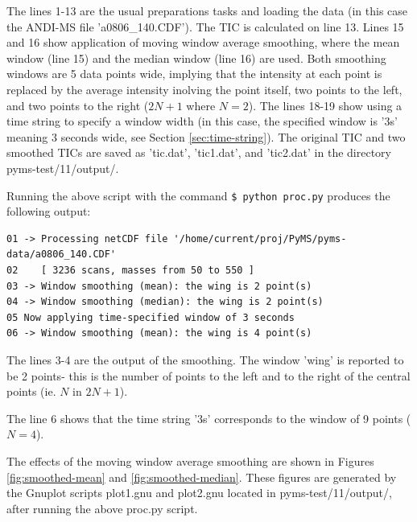 \noindent
The lines 1-13 are the usual preparations tasks and loading the data (in this
case the ANDI-MS file 'a0806\_140.CDF'). The TIC is calculated on line 13.
Lines 15 and 16 show application of moving window average smoothing, where
the mean window (line 15) and the median window (line 16) are used. Both
smoothing windows are 5 data points wide, implying that the intensity at
each point is replaced by the average intensity inolving the point itself,
two points to the left, and two points to the right ($2N+1$ where $N=2$).
The lines 18-19 show using a time string to specify a window width (in
this case, the specified window is '3s' meaning 3 seconds wide, see
Section \ref{sec:time-string}).  The original TIC and two smoothed TICs are
saved as 'tic.dat', 'tic1.dat', and 'tic2.dat' in the directory
pyms-test/11/output/.

Running the above script with the command {\tt \$ python proc.py} produces
the following output:

\begin{verbatim}
01 -> Processing netCDF file '/home/current/proj/PyMS/pyms-data/a0806_140.CDF'
02    [ 3236 scans, masses from 50 to 550 ]
03 -> Window smoothing (mean): the wing is 2 point(s)
04 -> Window smoothing (median): the wing is 2 point(s)
05 Now applying time-specified window of 3 seconds
06 -> Window smoothing (mean): the wing is 4 point(s)
\end{verbatim}

\noindent
The lines 3-4 are the output of the smoothing.  The window 'wing' is reported
to be 2 points- this is the number of points to the left and to the right of
the central points (ie. $N$ in $2N+1$).

\noindent
The line 6 shows that the time string '3s' corresponds to the window of
9 points ($N=4$).

The effects of the moving window average smoothing are shown in Figures 
\ref{fig:smoothed-mean} and \ref{fig:smoothed-median}. These figures are generated
by the Gnuplot scripts plot1.gnu and plot2.gnu located in
pyms-test/11/output/, after running the above proc.py script.

